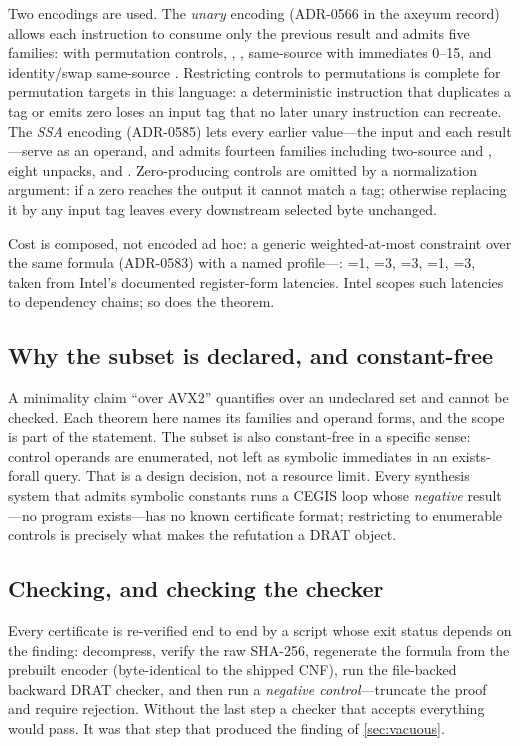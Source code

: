 Two encodings are used. The \emph{unary} encoding (ADR-0566 in the axeyum record) allows each instruction to consume only the previous result and admits five families:  with permutation controls, , , same-source  with immediates 0--15, and identity/swap same-source . Restricting controls to permutations is complete for permutation targets in this language: a deterministic instruction that duplicates a tag or emits zero loses an input tag that no later unary instruction can recreate. The \emph{SSA} encoding (ADR-0585) lets every earlier value---the input and each result---serve as an operand, and admits fourteen families including two-source  and , eight unpacks, and . Zero-producing controls are omitted by a normalization argument: if a zero reaches the output it cannot match a tag; otherwise replacing it by any input tag leaves every downstream selected byte unchanged.

Cost is composed, not encoded ad hoc: a generic weighted-at-most constraint over the same formula (ADR-0583) with a named profile---: =1, =3, =3, =1, =3, taken from Intel's documented register-form latencies. Intel scopes such latencies to dependency chains; so does the theorem.

\subsection{Why the subset is declared, and constant-free}

A minimality claim \enquote{over AVX2} quantifies over an undeclared set and cannot be checked. Each theorem here names its families and operand forms, and the scope is part of the statement. The subset is also constant-free in a specific sense: control operands are enumerated, not left as symbolic immediates in an exists-forall query. That is a design decision, not a resource limit. Every synthesis system that admits symbolic constants runs a CEGIS loop whose \emph{negative} result---no program exists---has no known certificate format; restricting to enumerable controls is precisely what makes the refutation a DRAT object.

\subsection{Checking, and checking the checker}

Every certificate is re-verified end to end by a script whose exit status depends on the finding: decompress, verify the raw SHA-256, regenerate the formula from the prebuilt encoder (byte-identical to the shipped CNF), run the file-backed backward DRAT checker, and then run a \emph{negative control}---truncate the proof and require rejection. Without the last step a checker that accepts everything would pass. It was that step that produced the finding of \cref{sec:vacuous}.
